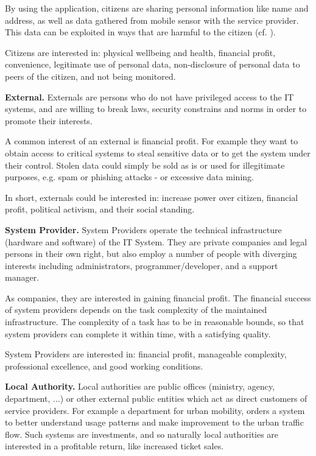 \documentclass[runningheads,a4paper]{llncs}
\begin{document}
By using the application, citizens are sharing personal information like name and address, as well as data gathered from mobile sensor with the service provider. This data can be exploited in ways that are harmful to the citizen (cf. \cite{GuardienMassSurveillance}).

Citizens are interested in: physical wellbeing and health, financial profit, convenience, legitimate use of personal data, non-disclosure of personal data to peers of the citizen, and not being monitored.

\textbf{External.}
Externals are persons who do not have privileged access to the IT systems, and are willing to break laws, security constrains and norms in order to promote their interests. 

A common interest of an external is financial profit. For example they want to obtain access to critical systems to steal sensitive data or to get the system under their control. Stolen data could simply be sold as is or used for illegitimate purposes, e.g. spam or phishing attacks - or excessive data mining.

In short, externals could be interested in: increase power over citizen, financial profit, political activism, and their social standing.

\textbf{System Provider.}
System Providers operate the technical infrastructure (hardware and software) of the IT System.
They are private companies and legal persons in their own right, but also employ a number of people with diverging interests including administrators, programmer/developer, and a support manager.

As companies, they are interested in gaining financial profit. The financial success of system providers depends on the task complexity of the maintained infrastructure. The complexity of a task has to be in reasonable bounds, so that system providers can complete it within time, with a satisfying quality.

System Providers are interested in: financial profit, manageable complexity, professional excellence, and good working conditions.

\textbf{Local Authority.}
Local authorities are public offices (ministry, agency, department, ...) or other external public entities which act as direct customers of service providers. For example a department for urban mobility, orders a system to better understand usage patterns and make improvement to the urban traffic flow. Such systems are investments, and so naturally local authorities are interested in a profitable return, like increased ticket sales.
\end{document}
